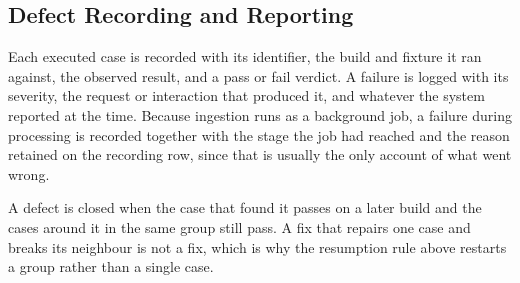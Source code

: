\subsection{Defect Recording and Reporting}

Each executed case is recorded with its identifier, the build and fixture it ran against,
the observed result, and a pass or fail verdict. A failure is logged with its severity,
the request or interaction that produced it, and whatever the system reported at the
time. Because ingestion runs as a background job, a failure during processing is recorded
together with the stage the job had reached and the reason retained on the recording row,
since that is usually the only account of what went wrong.

A defect is closed when the case that found it passes on a later build and the cases
around it in the same group still pass. A fix that repairs one case and breaks its
neighbour is not a fix, which is why the resumption rule above restarts a group rather
than a single case.
